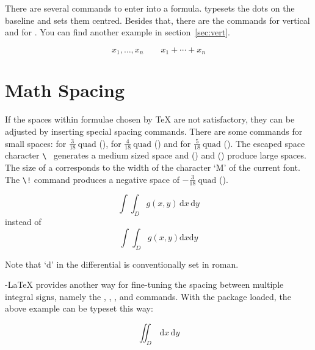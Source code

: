 There are several commands to enter \textbf{} into a formula.
 typesets the dots on the baseline and 
sets them centred. Besides that, there are the commands  for
vertical and  for . You can find another example in section~\ref{sec:vert}.
\begin{example}
\begin{displaymath}
x_{1},\ldots,x_{n} \qquad
x_{1}+\cdots+x_{n}
\end{displaymath}
\end{example}
 
\section{Math Spacing}

 If the spaces within formulae chosen by \TeX{}
are not satisfactory, they can be adjusted by inserting special
spacing commands. There are some commands for small spaces: \ci{,} for
$\frac{3}{18}\:\textrm{quad}$ (\demowidth{0.166em}), \ci{:} for $\frac{4}{18}\:
\textrm{quad}$ (\demowidth{0.222em}) and \ci{;} for $\frac{5}{18}\:
\textrm{quad}$ (\demowidth{0.277em}).  The escaped space character
\verb*.\ . generates a medium sized space and 
(\demowidth{1em}) and  (\demowidth{2em}) produce large
spaces. The size of a  corresponds to the width of the
character `M' of the current font.  The \verb|\!| command produces a
negative space of $-\frac{3}{18}\:\textrm{quad}$ (\demowidth{0.166em}).
\begin{example}
\newcommand{\ud}{\mathrm{d}}
\begin{displaymath}
\int\!\!\!\int_{D} g(x,y)
  \, \ud x\, \ud y 
\end{displaymath}
instead of 
\begin{displaymath}
\int\int_{D} g(x,y)\ud x \ud y
\end{displaymath}
\end{example}
Note that `d' in the differential is conventionally set in roman.

\AmS-\LaTeX{} provides another way for fine-tuning
the spacing between multiple integral signs,
namely the , , , and  commands.
With the  package loaded, the above example can be
typeset this way:
\begin{example}
\newcommand{\ud}{\mathrm{d}}
\begin{displaymath}
\iint_{D} \, \ud x \, \ud y
\end{displaymath}
\end{example}


